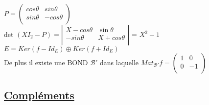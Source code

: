 \documentclass{article}
\begin{document}
$P = \begin{pmatrix}
    cos \theta & sin \theta\\
    sin \theta & -cos \theta\\
\end{pmatrix}$\\
det $(X I_2 - P) = \left|
    \begin{matrix}
        X - cos \theta & \sin \theta\\
        -sin \theta & X + cos \theta\\
    \end{matrix}
\right|$ = $X^2 -1$\\
$E = Ker(f - Id_E) \oplus Ker (f + Id_E)$\\
De plus il existe une BOND $\mathcal{B}'$ dans laquelle $Mat_{\mathcal{B}'} f = \begin{pmatrix}
    1 & 0\\
    0 & -1\\
\end{pmatrix}$

\subsection{\underline{Compléments}}
\end{document}
